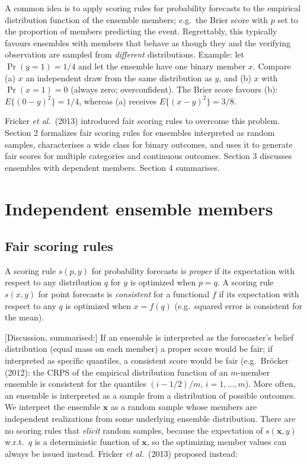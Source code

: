\documentclass{article}
\newcommand{\bx}{\mathbf{x}}
\begin{document}
A common idea is to apply scoring rules for probability forecasts to the
empirical distribution function of the ensemble members; e.g.\ the Brier score
with $p$ set to the proportion of members predicting the event. Regrettably,
this typically favours ensembles with members that behave as though they and
the verifying observation are sampled from \emph{different} distributions.
Example: let $\Pr(y=1)=1/4$ and let the ensemble have one binary member $x$.
Compare (a) $x$ an independent draw from the same distribution as $y$, and
(b) $x$ with $\Pr(x=1)=0$ (always zero; overconfident). The Brier score favours
(b): $E\{(0-y)^2\}=1/4$, whereas (a) receives $E\{(x-y)^2\}=3/8$.

Fricker \emph{et al.}\ (2013) introduced fair scoring rules to overcome this
problem. Section 2 formalizes fair scoring rules for ensembles interpreted as
random samples, characterises a wide class for binary outcomes, and uses it to
generate fair scores for multiple categories and continuous outcomes. Section 3
discusses ensembles with dependent members. Section 4 summarises.

\section{Independent ensemble members}
\subsection{Fair scoring rules}
A scoring rule $s(p,y)$ for probability forecasts is \emph{proper} if its
expectation with respect to any distribution $q$ for $y$ is optimized when
$p=q$. A scoring rule $s(x,y)$ for point forecasts is \emph{consistent} for a
functional $f$ if its expectation with respect to any $q$ is optimized when
$x=f(q)$ (e.g.\ squared error is consistent for the mean).

[Discussion, summarised:] If an ensemble is interpreted as the forecaster's
belief distribution (equal mass on each member) a proper score would be fair;
if interpreted as specific quantiles, a consistent score would be fair (e.g.\
Br\"ocker (2012): the CRPS of the empirical distribution function of an
$m$-member ensemble is consistent for the quantiles $(i-1/2)/m$,
$i=1,\dots,m$). More often, an ensemble is interpreted as a sample from a
distribution of possible outcomes. We interpret the ensemble $\bx$ as a random
sample whose members are independent realizations from some underlying
ensemble distribution. There are no scoring rules that \emph{elicit} random
samples, because the expectation of $s(\bx,y)$ w.r.t.\ $q$ is a deterministic
function of $\bx$, so the optimizing member values can always be issued instead.
Fricker \emph{et al.}\ (2013) proposed instead:
\end{document}
